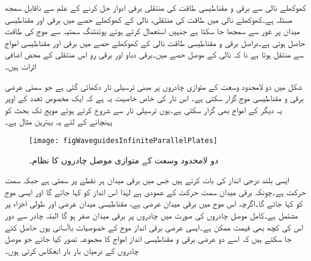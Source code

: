 کھوکھلے نالی سے برقی و مقناطیسی طاقت کی منتقلی برقی ادوار حل کرنے کے علم سے ناقابل سمجھ مسئلہ ہے۔کھوکھلے نالی میں طاقت کی منتقلی، نالی کے کھوکھلے حصے میں برقی اور مقناطیسی میدان پر غور سے سمجھا جا سکتا ہے جنہیں استعمال کرتے ہوئے  پوئنٹنگ سمتیہ سے موج کی طاقت حاصل ہوتی ہے۔دراصل برقی و مقناطیسی طاقت نالی کے کھوکھلے حصے میں برقی اور مقناطیسی امواج سے منتقل ہوتا ہے نا کہ نالی کے موصل حصے میں۔برقی دباو اور برقی رو اس منتقلی کے محض اضافی اثرات ہیں۔ 

شکل  میں دو لامحدود وسعت کے متوازی چادروں پر مبنی ترسیلی تار دکھائی گئی ہے جو  سمتی عرضی برقی و مقناطیسی موج گزار سکتی
 ہے۔ اس تار کی خاص خاصیت یہ ہے کہ ایک مخصوص تعدد کے اوپر یہ دیگر  کے امواج بھی گزار سکتی ہے۔یوں ترسیلی تار سے شروع کرتے ہوئے مویج تک بحث کو پہنچانے  کے لئے یہ بہترین مثال ہے۔

\begin{figure}
\centering
\texttt{[image: figWaveguidesInfiniteParallelPlates]}
\caption{دو لامحدود وسعت کے متوازی موصل چادروں کا نظام۔}
\label{شکل_مویج_لامحدود_متوازی_چادر}
\end{figure}

ایسی بلند درجی انداز کی بات کرتے ہیں جس میں برقی میدان ہر نقطے پر  سمتی ہے جبکہ سمت حرکت  ہے۔چونکہ برقی میدان سمت حرکت کے عمودی ہے لہٰذا اس انداز کو   کہا جائے گا اور ایسی موج کو  کہا جائے گا۔اگرچہ اس موج میں برقی میدان عرضی ہے، مقناطیسی میدان عرضی اور طولی اجزاء پر مشتمل ہے۔کامل موصل چادروں کی صورت میں چادروں پر برقی میدان صفر ہو گا البتہ چادر سے دور  اس کی کچھ بھی قیمت ممکن ہے۔ایسی عرضی برقی انداز موج کے خصوصیات باآسانی یوں حاصل کئے جا سکتے ہیں کہ اسے دو عرضی برقی و مقناطیسی انداز  امواج کا مجموعہ تصور کیا جائے جو موصل چادروں کے درمیان بار بار انعکاس کرتی ہوں۔

